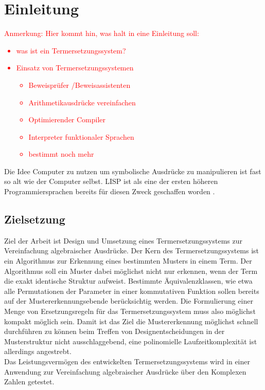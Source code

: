 

\section{Einleitung} \label{secEinleitung}
\textcolor{red} {
\begin{itshape}
Anmerkung: Hier kommt hin, was halt in eine Einleitung soll:
\begin{itemize}
    \item was ist ein Termersetzungssystem?
    \item Einsatz von Termersetzungssystemen
    \begin{itemize}
        \item Beweisprüfer /Beweisassistenten
        \item Arithmetikausdrücke vereinfachen
        \item Optimierender Compiler
        \item Interpreter funktionaler Sprachen
        \item bestimmt noch mehr
    \end{itemize}
\end{itemize}
\end{itshape}
}

Die Idee Computer zu nutzen um symbolische Ausdrücke zu manipulieren ist fast so alt wie der Computer selbst.  LISP ist als eine der ersten höheren Programmiersprachen bereits für diesen Zweck geschaffen worden \cite{lisp}. 

\subsection{Zielsetzung}
Ziel der Arbeit ist Design und Umsetzung eines Termersetzungssystems zur Vereinfachung algebraischer Ausdrücke. Der Kern des Termersetzungssystems ist ein Algorithmus zur Erkennung eines bestimmten Musters in einem Term. 
Der Algorithmus soll ein Muster dabei möglichst nicht nur erkennen, wenn der Term die exakt identische Struktur aufweist. Bestimmte Äquivalenzklassen, wie etwa alle Permutationen der Parameter in einer kommutativen Funktion sollen bereits auf der Mustererkennungsebende berücksichtig werden. Die Formulierung einer Menge von Ersetzungsregeln für das Termersetzungssystem muss also möglichst kompakt möglich sein. 
Damit ist das Ziel die Mustererkennung möglichst schnell durchführen zu können beim Treffen von Designentscheidungen in der Musterstruktur nicht ausschlaggebend, eine polinomielle Laufzeitkomplexität ist allerdings angestrebt.\\
Das Leistungsvermögen des entwickelten Termersetzungssystems wird in einer Anwendung zur Vereinfachung algebraischer Ausdrücke über den Komplexen Zahlen getestet. 

